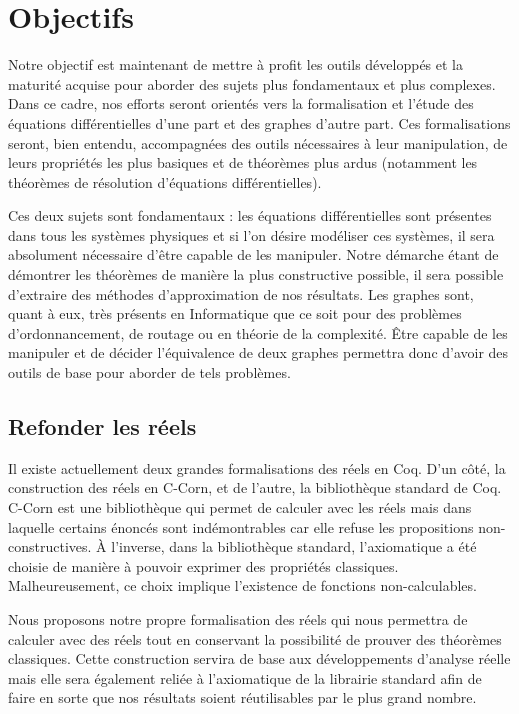 \documentclass[11pt]{article}
\begin{document}
\section{Objectifs}

Notre objectif est maintenant de mettre à profit les outils développés et la maturité acquise pour aborder des sujets plus fondamentaux et plus complexes. Dans ce cadre, nos efforts seront orientés vers la formalisation et l'étude des équations différentielles d'une part et des graphes d'autre part. Ces formalisations seront, bien entendu, accompagnées des outils nécessaires à leur manipulation, de leurs propriétés les plus basiques et de théorèmes plus ardus (notamment les théorèmes de résolution d'équations différentielles).

Ces deux sujets sont fondamentaux : les équations différentielles sont présentes dans tous les systèmes physiques et si l'on désire modéliser ces systèmes, il sera absolument nécessaire d'être capable de les manipuler. Notre démarche étant de démontrer les théorèmes de manière la plus constructive possible, il sera possible d'extraire des méthodes d'approximation de nos résultats.
Les graphes sont, quant à eux, très présents en Informatique que ce soit pour des problèmes d'ordonnancement, de routage ou en théorie de la complexité. Être capable de les manipuler et de décider l'équivalence de deux graphes permettra donc d'avoir des outils de base pour aborder de tels problèmes.

\subsection{Refonder les réels}
Il existe actuellement deux grandes formalisations des réels en Coq. D'un côté, la construction des réels en C-Corn, et de l'autre, la bibliothèque standard de Coq. C-Corn est une bibliothèque qui permet de calculer avec les réels mais dans laquelle certains énoncés sont indémontrables car elle refuse les propositions non-constructives. À l'inverse, dans la bibliothèque standard, l'axiomatique a été choisie de manière à pouvoir exprimer des propriétés classiques. Malheureusement, ce choix implique l'existence de fonctions non-calculables.

Nous proposons notre propre formalisation des réels qui nous permettra de calculer avec des réels tout en conservant la possibilité de prouver des théorèmes classiques. Cette construction servira de base aux développements d'analyse réelle mais elle sera également reliée à l'axiomatique de la librairie standard afin de faire en sorte que nos résultats soient réutilisables par le plus grand nombre.
\end{document}

